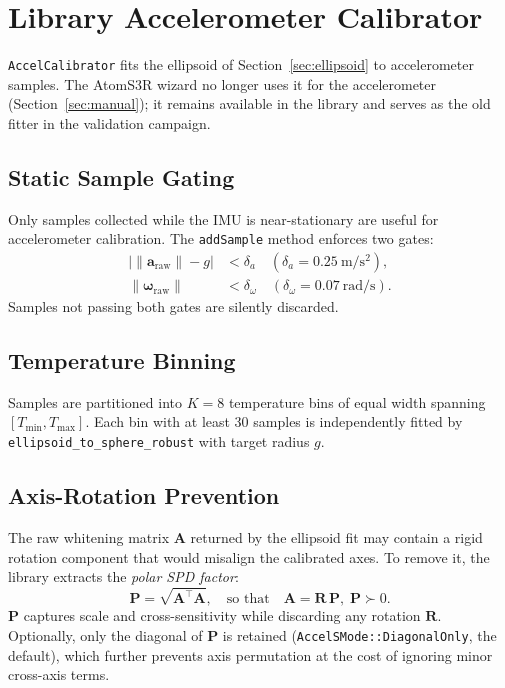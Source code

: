 \documentclass[conference]{IEEEtran}
\begin{document}
    \section{Library Accelerometer Calibrator}
    \label{sec:accel_fit}

    \texttt{AccelCalibrator} fits the ellipsoid of
    Section~\ref{sec:ellipsoid} to accelerometer samples.
    The AtomS3R wizard no longer uses it for the accelerometer
    (Section~\ref{sec:manual}); it remains available in the library and
    serves as the old fitter in the validation campaign.

    \subsection{Static Sample Gating}

    Only samples collected while the IMU is near-stationary are useful for
    accelerometer calibration.
    The \texttt{addSample} method enforces two gates:
    \begin{align}
        \bigl|\|\mathbf{a}_\text{raw}\| - g\bigr| &< \delta_a
        \quad (\delta_a = \SI{0.25}{\meter\per\second\squared}), \\
        \|\boldsymbol{\omega}_\text{raw}\| &< \delta_\omega
        \quad (\delta_\omega = \SI{0.07}{\radian\per\second}).
    \end{align}
    Samples not passing both gates are silently discarded.

    \subsection{Temperature Binning}

    Samples are partitioned into $K = 8$ temperature bins of equal width
    spanning $[T_\text{min}, T_\text{max}]$.
    Each bin with at least 30 samples is independently fitted by
    \texttt{ellipsoid\_to\_sphere\_robust} with target radius $g$.

    \subsection{Axis-Rotation Prevention}
    \label{sec:polar}

    The raw whitening matrix $\mathbf{A}$ returned by the ellipsoid fit
    may contain a rigid rotation component that would misalign the calibrated
    axes.
    To remove it, the library extracts the \emph{polar SPD factor}:
    \begin{equation}
        \mathbf{P} = \sqrt{\mathbf{A}^\top\mathbf{A}},
        \quad\text{so that}\quad
        \mathbf{A} = \mathbf{R}\,\mathbf{P},\;
        \mathbf{P} \succ 0.
    \end{equation}
    $\mathbf{P}$ captures scale and cross-sensitivity while discarding any
    rotation $\mathbf{R}$.
    Optionally, only the diagonal of $\mathbf{P}$ is retained
    (\texttt{AccelSMode::DiagonalOnly}, the default), which further
    prevents axis permutation at the cost of ignoring minor cross-axis
    terms.
\end{document}
